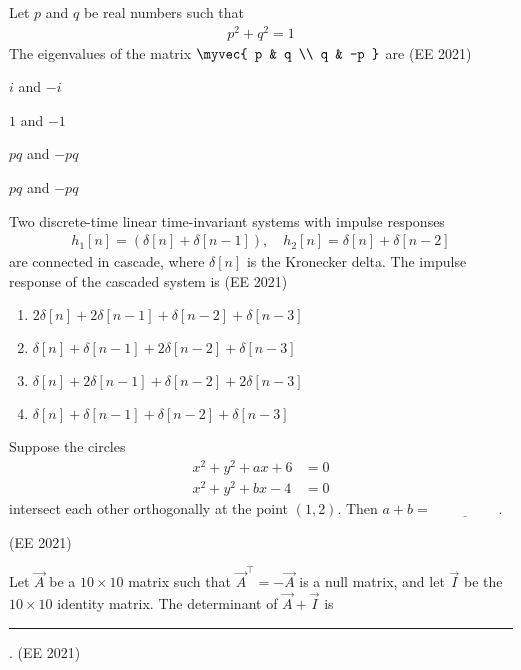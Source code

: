\item Let $p$ and $q$ be real numbers such that \begin{align*}
    p^2+q^2=1
\end{align*}  
The eigenvalues of the matrix  
$
\myvec{
p & q \\
q & -p
}
$
are
\hfill (EE 2021)
\begin{enumerate}
\begin{multicols}{2}
\item $i$ and $-i$
\item $1$ and $-1$
\item $pq$ and $-pq$
\item $pq$ and $-pq$
\end{multicols}
\end{enumerate}
\item Two discrete-time linear time-invariant systems with impulse responses  
\begin{align*}
    h_1[n] = ( \delta[n] + \delta[n-1] ), \quad h_2[n] = \delta[n] + \delta[n-2]
\end{align*}
are connected in cascade, where $\delta[n]$ is the Kronecker delta. The impulse response of the cascaded system is
\hfill (EE 2021)
\begin{multicols}{2}
\begin{enumerate}
\item $2\delta[n] + 2\delta[n-1] + \delta[n-2] + \delta[n-3]$
\item $\delta[n] + \delta[n-1] + 2\delta[n-2] + \delta[n-3]$
\item $\delta[n] + 2\delta[n-1] + \delta[n-2] + 2\delta[n-3]$
\item $\delta[n] + \delta[n-1] + \delta[n-2] + \delta[n-3]$
\end{enumerate}
\end{multicols}
\item Suppose the circles 
\begin{align*}
	x^2 + y^2 + ax + 6 &= 0
    \\
	x^2 + y^2 + bx - 4 &= 0
\end{align*}
intersect each other orthogonally at the point $(1,2)$.  
Then $a+b = \underline{\hspace{2cm}}$.

\hfill (EE 2021)
\item Let $\vec{A}$ be a $10 \times 10$ matrix such that $\vec{A}^{\top} = -\vec{A}$ is a null matrix, 
and let $\vec{I}$ be the $10 \times 10$ identity matrix.  
The determinant of $\vec{A} + \vec{I}$ is  \rule{1cm}{0.01pt}.
\hfill (EE 2021)
